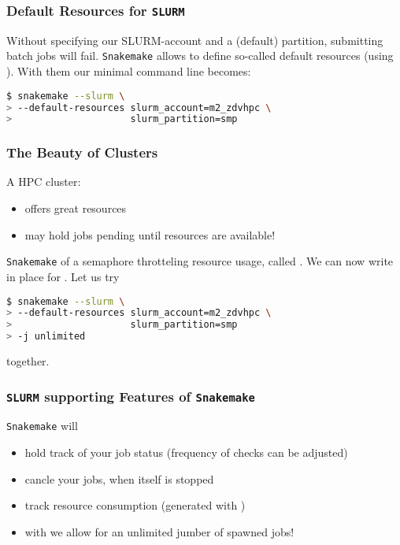 \begin{frame}[fragile]
  \frametitle{Default Resources for \texttt{SLURM}}
  Without specifying our SLURM-account and a (default) partition, submitting batch jobs will fail. \texttt{Snakemake} allows to define so-called default resources (using ). With them our minimal command line becomes:
  \begin{lstlisting}[language=Bash, style=Shell, breaklines=true]
$ snakemake --slurm \
> --default-resources slurm_account=m2_zdvhpc \
>                     slurm_partition=smp
  \end{lstlisting}
\end{frame}

\begin{frame}[fragile]
  \frametitle{The Beauty of Clusters}
  A HPC cluster:
  \begin{itemize}
   \item offers great resources
   \item may hold jobs pending until resources are available!
  \end{itemize}
  \pause
  \texttt{Snakemake} of a semaphore throtteling resource usage, called . We can now write  in place for . Let us try
  \begin{lstlisting}[language=Bash, style=Shell, breaklines=true]
$ snakemake --slurm \
> --default-resources slurm_account=m2_zdvhpc \
>                     slurm_partition=smp
> -j unlimited
  \end{lstlisting}
  together.
\end{frame}

\begin{frame}[fragile]
  \frametitle{\texttt{SLURM} supporting Features of \texttt{Snakemake}}
  \texttt{Snakemake} will
  \begin{itemize}[<+->]
   \item hold track of your job status (frequency of checks can be adjusted)
   \item cancle your jobs, when itself is stopped
   \item track resource consumption (generated with )
   \item with  we allow for an unlimited jumber of spawned jobs!
  \end{itemize}
  \pause
\end{frame}

